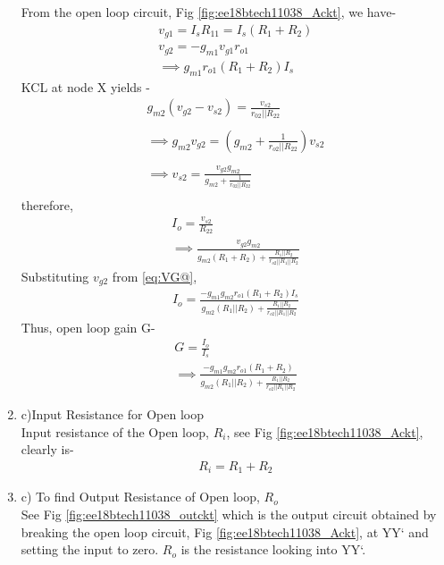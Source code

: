 \begin{enumerate}[label=\arabic*.,ref=\theenumi]
From the open loop circuit, Fig \ref{fig:ee18btech11038_Ackt}, we have-
\begin{align}
\label{eq:VG2}
    v_{g1} = I_{s}R_{11} = I_{s}(R_{1} + R_{2})\\
\label{eq:VG@}
    v_{g2} = -g_{m1}v_{g1}r_{o1}\\
    \implies g_{m1}r_{o1}(R_{1} + R_{2})I_{s}
\end{align}
KCL at node X yields -
\begin{align}
    g_{m2}(v_{g2} - v_{s2}) = \frac{v_{s2}}{r_{02}||R_{22}}\\ \\
    \implies g_{m2}v_{g2} = (g_{m2} + \frac{1}{r_{o2}||R_{22}})v_{s2}\\ \\
    \implies v_{s2} = \frac{v_{g2}g_{m2}}{g_{m2} + \frac{1}{r_{02}||R_{22}}}\\
\end{align}
therefore,
\begin{align}
    I_{o} = \frac{v_{s2}}{R_{22}}\\
    \implies \frac{v_{g2}g_{m2}}{g_{m2}(R_{1} + R_{2}) + \frac{R_{1}||R_{2}}{r_{o2}||R_{1}||R_{2}}}
\end{align}
Substituting $v_{g2}$ from \ref{eq:VG@},
\begin{align}
    I_{o} = \frac{-g_{m1}g_{m2}r_{o1}(R_{1} + R_{2})I_{s}}{g_{m2}(R_{1}||R_{2}) + \frac{R_{1}||R_{2}}{r_{o2}||R_{1}||R_{2}}}
\end{align}
Thus, open loop gain G- 
\begin{align}
    G = \frac{I_{o}}{I_{s}}\\
    \implies \frac{-g_{m1}g_{m2}r_{o1}(R_{1} + R_{2})}{g_{m2}(R_{1}||R_{2}) + \frac{R_{1}||R_{2}}{r_{o2}||R_{1}||R_{2}}}
\end{align}
\item c)Input Resistance for Open loop\\
\solution Input resistance of the Open loop, $R_{i}$, see Fig \ref{fig:ee18btech11038_Ackt}, clearly is-
\begin{align}
\label{eq:Ri}
    R_{i} = R_{1} + R_{2}
\end{align}
\item c) To find Output Resistance of Open loop, $R_{o}$\\
\solution See Fig \ref{fig:ee18btech11038_outckt} which is the output circuit obtained by breaking the open loop circuit, Fig \ref{fig:ee18btech11038_Ackt}, at YY` and setting the input to zero. $R_{o}$ is the resistance looking into YY`.


\end{enumerate}
